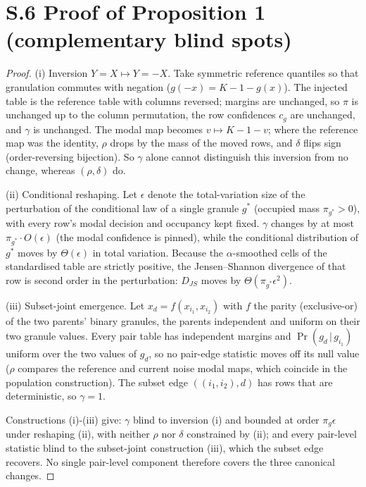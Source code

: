 \documentclass[11pt,a4paper]{article}
\begin{document}
\section*{S.6 Proof of Proposition 1 (complementary blind spots)}

\begin{proof}
(i) Inversion $Y=X \mapsto Y=-X$. Take symmetric reference quantiles so that
granulation commutes with negation ($g(-x)=K-1-g(x)$). The injected table is
the reference table with columns reversed; margins are unchanged, so
$\pi$ is unchanged up to the column permutation, the row confidences
$c_g$ are unchanged, and $\gamma$ is unchanged. The modal map becomes
$v\mapsto K-1-v$; where the reference map was the identity, $\rho$ drops by
the mass of the moved rows, and $\delta$ flips sign (order-reversing
bijection). So $\gamma$ alone cannot distinguish this inversion from no
change, whereas $(\rho,\delta)$ do.

(ii) Conditional reshaping. Let $\epsilon$ denote the total-variation size
of the perturbation of the conditional law of a single granule $g^\ast$
(occupied mass $\pi_{g^\ast}>0$), with every row's modal decision and
occupancy kept fixed. $\gamma$ changes by at most $\pi_{g^\ast}\cdot
O(\epsilon)$ (the modal confidence is pinned), while the conditional
distribution of $g^\ast$ moves by $\Theta(\epsilon)$ in total variation.
Because the $\alpha$-smoothed cells of the standardised table are strictly
positive, the Jensen--Shannon divergence of that row is second order in
the perturbation: $D_{JS}$ moves by $\Theta(\pi_{g^\ast}\epsilon^2)$.

(iii) Subset-joint emergence. Let $x_d=f(x_{i_1},x_{i_2})$ with $f$ the
parity (exclusive-or) of the two parents' binary granules, the parents
independent and uniform on their two granule values. Every pair table has
independent margins and $\Pr(g_d\,|\,g_{i_1})$ uniform over the two values of $g_d$,
so no pair-edge statistic moves off its null value ($\rho$ compares
the reference and current noise modal maps, which coincide in the
population construction). The subset edge
$((i_1,i_2),d)$ has rows that are deterministic, so $\gamma=1$.

Constructions (i)-(iii) give: $\gamma$ blind to inversion (i) and
bounded at order $\pi_g\epsilon$ under reshaping (ii), with neither $\rho$ nor $\delta$ constrained by (ii); and every pair-level
statistic blind to the subset-joint construction (iii), which the subset
edge recovers. No single pair-level component therefore covers the three
canonical changes.
\end{proof}
\end{document}
